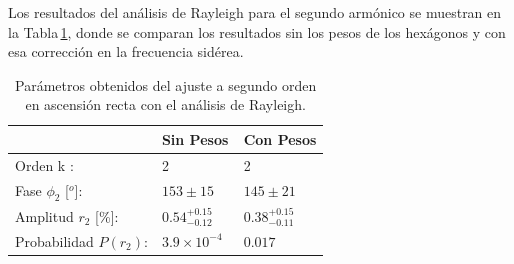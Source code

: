 		 Los resultados del análisis de Rayleigh para el segundo armónico se muestran en la Tabla\,\ref{table:parametros_second_order}, donde se comparan los resultados sin los pesos de los hexágonos y con esa corrección en la frecuencia sidérea. %




		\begin{table}[H]
		\centering
			\begin{tabular}{l|l|l|}
			\cline{2-3}
			                                      			& Sin Pesos 				 & Con Pesos \\ \hline
			\multicolumn{1}{|l|}{Orden k :}       			& 2                			& 2                    \\ \hline
			\multicolumn{1}{|l|}{Fase $\phi_2$ [$^o$]:}  	& $153\pm15$    				& $145\pm21$                   \\ \hline
			\multicolumn{1}{|l|}{Amplitud $r_2$ [\%]:} 		& $0.54^{+0.15}_{-0.12}$	& $0.38^{+0.15}_{-0.11}$               \\ \hline
			\multicolumn{1}{|l|}{Probabilidad $P(r_2)$:}    & $3.9\times 10^{-4}$\      & $0.017$  \\ \hline
			\end{tabular}
		\caption{Parámetros obtenidos del ajuste a segundo orden en ascensión recta con el análisis de Rayleigh.}
		\label{table:parametros_second_order}
		\end{table}
